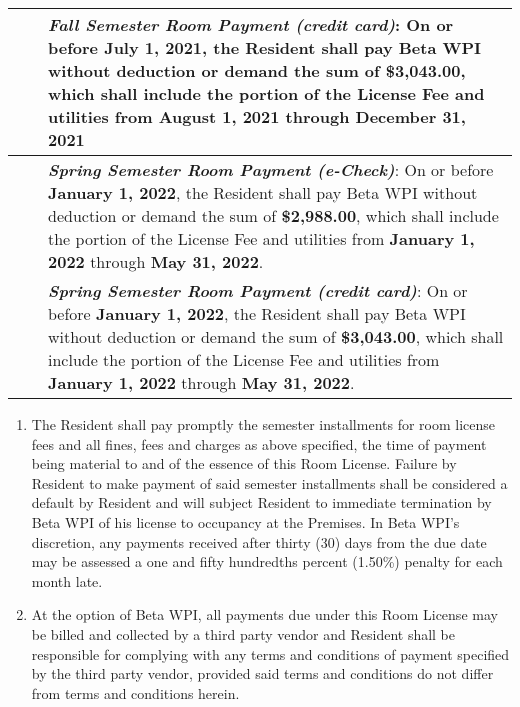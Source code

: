 \documentclass[legalpaper, 12pt]{article}
\begin{document}
\begin{enumerate}
\begin{tabular}{|c|c|p{4in}|}
        &  & \textbf{\textit{Fall Semester Room Payment (credit card)}}: On or
        before \textbf{July 1, 2021}, the Resident shall pay Beta WPI without
        deduction or demand the sum of \textbf{\$3,043.00}, which shall include
        the portion of the License Fee and utilities from \textbf{August 1,
        2021} through \textbf{December 31, 2021} \\ \hline

        &  & \textbf{\textit{Spring Semester Room Payment (e-Check)}}: On or
        before \textbf{January 1, 2022}, the Resident shall pay Beta WPI without
        deduction or demand the sum of \textbf{\$2,988.00}, which shall include
        the portion of the License Fee and utilities from \textbf{January 1,
        2022} through \textbf{May 31, 2022}. \\ \hline

        &  & \textbf{\textit{Spring Semester Room Payment (credit card)}}: On or
        before \textbf{January 1, 2022}, the Resident shall pay Beta WPI without
        deduction or demand the sum of \textbf{\$3,043.00}, which shall include
        the portion of the License Fee and utilities from \textbf{January 1,
        2022} through \textbf{May 31, 2022}. \\ \hline

\end{tabular}

        \begin{enumerate}[label=\Alph*.] 

                \item The Resident shall pay promptly the semester installments
                        for room license fees and all fines, fees and charges
                        as above specified, the time of payment being material
                        to and of the essence of this Room License.  Failure by
                        Resident to make payment of said semester installments
                        shall be considered a default by Resident and will
                        subject Resident to immediate termination by Beta WPI
                        of his license to occupancy at the Premises.  In Beta
                        WPI’s discretion, any payments received after thirty
                        (30) days from the due date may be assessed a one and
                        fifty hundredths percent (1.50\%) penalty for each
                        month late. 

                \item At the option of Beta WPI, all payments due under this
                        Room License may be billed and collected by a third
                        party vendor and Resident shall be responsible for
                        complying with any terms and conditions of payment
                        specified by the third party vendor, provided said
                        terms and conditions do not differ from terms and
                        conditions herein.


\end{enumerate}
\end{enumerate}
\end{document}
